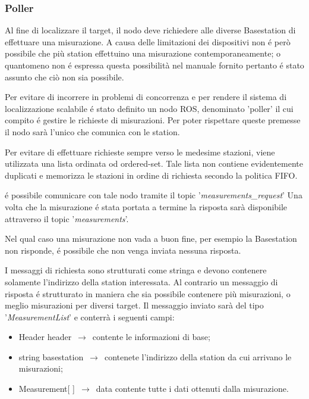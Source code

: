 \documentclass{article}
\begin{document}
\subsubsection{Poller}

Al fine di localizzare il target, il nodo deve richiedere alle diverse Basestation di effettuare una misurazione. 
A causa delle limitazioni dei dispositivi non \'e per\`o possibile che pi\`u station effettuino una misurazione contemporaneamente; o quantomeno non \'e espressa questa possibilit\`a nel manuale fornito pertanto \'e stato assunto che ci\`o non sia possibile.

Per evitare di incorrere in problemi di concorrenza e per rendere il sistema di localizzazione scalabile \'e stato definito un nodo ROS, denominato 'poller' il cui compito \'e gestire le richieste di misurazioni.
Per poter rispettare queste premesse il nodo sar\`a l'unico che comunica con le station.

Per evitare di effettuare richieste sempre verso le medesime stazioni, viene utilizzata una lista ordinata od ordered-set.
Tale lista non contiene evidentemente duplicati e memorizza le stazioni in ordine di richiesta secondo la politica FIFO.

\'e possibile comunicare con tale nodo tramite il topic '\textit{measurements\_request}' 
Una volta che la misurazione \'e stata portata a termine la risposta sar\`a disponibile attraverso il topic '\textit{measurements}'.

Nel qual caso una misurazione non vada a buon fine, per esempio la Basestation non risponde, \'e possibile che non venga inviata nessuna risposta.

I messaggi di richiesta sono strutturati come stringa e devono contenere solamente l'indirizzo della station interessata.
Al contrario un messaggio di risposta \'e strutturato in maniera che sia possibile contenere pi\`u misurazioni, o meglio misurazioni per diversi target.
Il messaggio inviato sar\`a del tipo '\textit{MeasurementList}' e conterr\`a i seguenti campi:

\begin{itemize}
	\item Header header $\,\to\,$ contente le informazioni di base;
	\item string basestation $\,\to\,$ contenete l'indirizzo della station da cui arrivano le misurazioni;
	\item Measurement[ ] $\,\to\,$ data contente tutte i dati ottenuti dalla misurazione.
\end{itemize}
\end{document}
